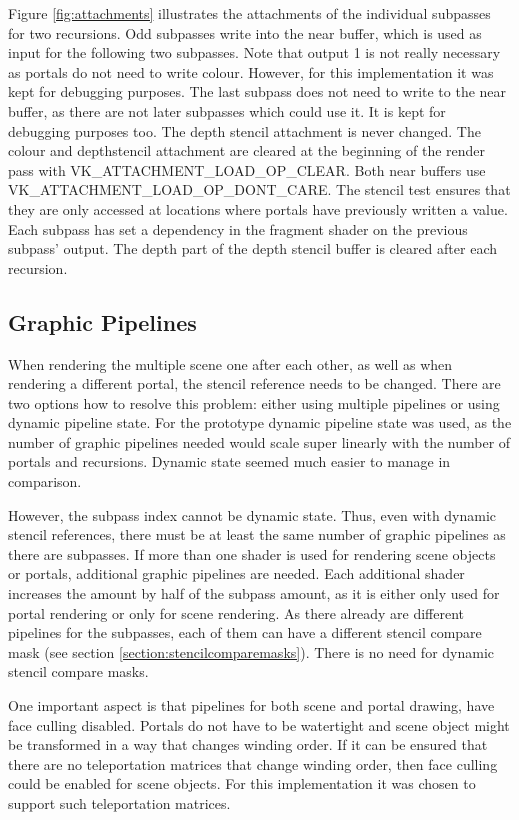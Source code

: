 Figure \ref{fig:attachments} illustrates the attachments of the individual subpasses for two recursions. Odd subpasses write into the near buffer, which is used as input for the following two subpasses.  Note that output 1 is not really necessary as portals do not need to write colour. However, for this implementation it was kept for debugging purposes. The last subpass does not need to write to the near buffer, as there are not later subpasses which could use it. It is kept for debugging purposes too. The depth stencil attachment is never changed. The colour and depthstencil attachment are cleared at the beginning of the render pass with VK\_ATTACHMENT\_LOAD\_OP\_CLEAR. Both near buffers use VK\_ATTACHMENT\_LOAD\_OP\_DONT\_CARE. The stencil test ensures that they are only accessed at locations where portals have previously written a value. Each subpass has set a dependency in the fragment shader on the previous subpass' output. The depth part of the depth stencil buffer is cleared after each recursion.


\subsection{Graphic Pipelines}
When rendering the multiple scene one after each other, as well as when rendering a different portal, the stencil reference needs to be changed. There are two options how to resolve this problem: either using multiple pipelines or using dynamic pipeline state. For the prototype dynamic pipeline state was used, as the number of graphic pipelines needed would scale super linearly with the number of portals and recursions. Dynamic state seemed much easier to manage in comparison.

However, the subpass index cannot be dynamic state. Thus, even with dynamic stencil references, there must be at least the same number of graphic pipelines as there are subpasses. If more than one shader is used for rendering scene objects or portals, additional graphic pipelines are needed. Each additional shader increases the amount by half of the subpass amount, as it is either only used for portal rendering or only for scene rendering. As there already are different pipelines for the subpasses, each of them can have a different stencil compare mask (see section \ref{section:stencilcomparemasks}). There is no need for dynamic stencil compare masks.

One important aspect is that pipelines for both scene and portal drawing, have face culling disabled. Portals do not have to be watertight and scene object might be transformed in a way that changes winding order. If it can be ensured that there are no teleportation matrices that change winding order, then face culling could be enabled for scene objects. For this implementation it was chosen to support such teleportation matrices.

